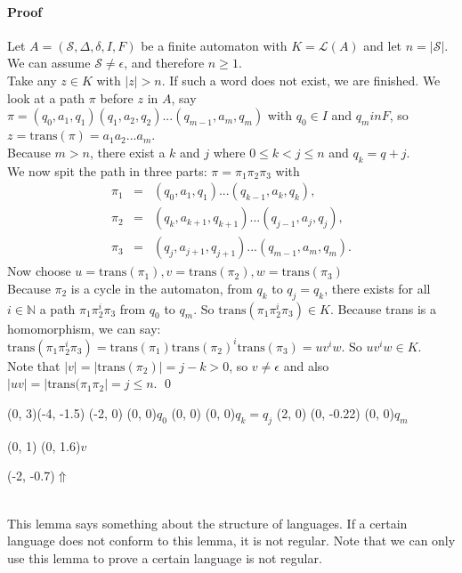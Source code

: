 \documentclass{article}
\begin{document}
\paragraph{Proof}
Let $A = (\mathcal{S}, \Delta, \delta, I, F)$ be a finite automaton with
$K = \mathcal{L}(A)$ and let $n = |\mathcal{S}|$. We can assume
$\mathcal{S} \ne \epsilon$, and therefore $n \ge 1$.\\
Take any $z \in K$ with $|z| > n$. If such a word does not exist, we are
finished. We look at a path $\pi$ before $z$ in $A$, say
$\pi = (q_0, a_1, q_1)(q_1, a_2, q_2)...(q_{m - 1}, a_m, q_m)$ with
$q_0 \in I$ and $q_m in F$, so $z = \mathrm{trans}(\pi) = a_1a_2...a_m$.\\
Because $m > n$, there exist a $k$ and $j$ where $0 \le k < j \le n$ and
$q_k = q+j$.\\
We now spit the path in three parts: $\pi = \pi_1 \pi_2 \pi_3$ with
\begin{eqnarray*}
  \pi_1 &=& (q_0, a_1, q_1) ... (q_{k - 1}, a_k, q_k),\\
  \pi_2 &=& (q_k, a_{k + 1}, q_{k + 1}) ... (q_{j - 1}, a_j, q_j),\\
  \pi_3 &=& (q_j, a_{j + 1}, q_{j + 1}) ... (q_{m - 1}, a_m, q_m).
\end{eqnarray*}
Now choose $u = \mathrm{trans}(\pi_1), v = \mathrm{trans}(\pi_2),
            w = \mathrm{trans}(\pi_3)$\\
Because $\pi_2$ is a cycle in the automaton, from $q_k$ to $q_j = q_k$, there
exists for all $i \in \mathbb{N}$ a path $\pi_1 \pi_2^i \pi_3$ from $q_0$ to
$q_m$. So $\mathrm{trans}(\pi_1 \pi_2^i \pi_3) \in K$. Because trans is a
homomorphism, we can say:  $\mathrm{trans}(\pi_1 \pi_2^i \pi_3) =
\mathrm{trans}(\pi_1) \mathrm{trans}(\pi_2)^i \mathrm{trans}(\pi_3) = uv^iw$.
So $uv^iw \in K$.\\
Note that $|v| = |\mathrm{trans}(\pi_2)| = j - k > 0$, so $v \ne \epsilon$
and also $|uv| = |\mathrm{trans}(\pi_1 \pi_2| = j \le n$. \qed\\
\begin{graph}(0, 3)(-4, -1.5)
  (-2, 0) (0, 0){$q_0$}
  (0, 0) (0, 0){$q_k = q_j$}
  (2, 0)
    (0, -0.22){} (0, 0){$q_m$}

   
  (0, 1) \freetext(0, 1.6){$v$}
   

  \freetext(-2, -0.7){$\Uparrow$}
\end{graph}\\
This lemma says something about the structure of languages. If a certain
language does not conform to this lemma, it is not regular. Note that we can
only use this lemma to prove a certain language is not regular.
\end{document}
